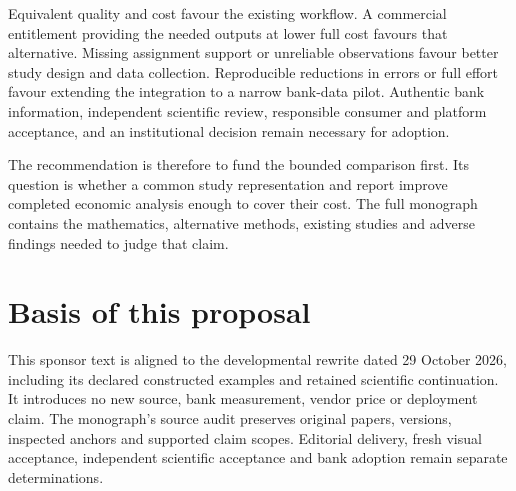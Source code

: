 Equivalent quality and cost favour the existing workflow. A commercial
entitlement providing the needed outputs at lower full cost favours that
alternative. Missing assignment support or unreliable observations favour
better study design and data collection. Reproducible reductions in errors
or full effort favour extending the integration to a narrow bank-data
pilot. Authentic bank information, independent scientific review, responsible
consumer and platform acceptance, and an institutional decision remain
necessary for adoption.

The recommendation is therefore to fund the bounded comparison first. Its
question is whether a common study representation and report improve
completed economic analysis enough to cover their cost. The full monograph
contains the mathematics, alternative methods, existing studies and adverse
findings needed to judge that claim.

\section*{Basis of this proposal}
This sponsor text is aligned to the developmental rewrite dated
29 October 2026, including its declared constructed examples and retained
scientific continuation. It introduces no new source, bank measurement,
vendor price or deployment claim. The monograph's source audit preserves
original papers, versions, inspected anchors and supported claim scopes.
Editorial delivery, fresh visual acceptance, independent scientific
acceptance and bank adoption remain separate determinations.
